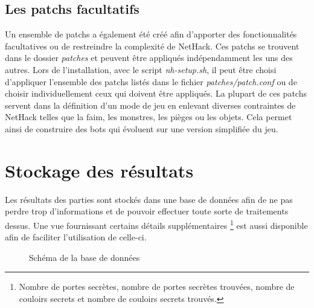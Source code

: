 \documentclass[10pt,a4paper]{report}
\begin{document}
\subsection{Les patchs facultatifs}
Un ensemble de patchs a également été créé afin d'apporter des fonctionnalités
facultatives ou de restreindre la complexité de NetHack. Ces patchs se
trouvent dans le dossier \emph{patches} et peuvent être appliqués
indépendamment les uns des autres. Lors de l'installation, avec le script
\emph{nh-setup.sh}, il peut être choisi d'appliquer l'ensemble des patchs
listés dans le fichier \emph{patches/patch.conf} ou de choisir
individuellement ceux qui doivent être appliqués.
La plupart de ces patchs servent dans la définition d'un mode de jeu en
enlevant diverses contraintes de NetHack telles que la faim, les monstres, les
pièges ou les objets. Cela permet ainsi de construire des bots qui évoluent sur
une version simplifiée du jeu.

\section{Stockage des résultats}
Les résultats des parties sont stockés dans une base de données afin de ne pas perdre
trop d'informations et de pouvoir effectuer toute sorte de traitements dessus. Une vue
fournissant certains détails supplémentaires \footnote{Nombre de portes secrètes,
nombre de portes secrètes trouvées, nombre de couloirs secrets et nombre de couloirs
secrets trouvés.} est aussi disponible afin de faciliter l'utilisation de celle-ci.

\begin{figure}[H]
	\caption{\label{fig:database} Schéma de la base de données}
\end{figure}
\end{document}
